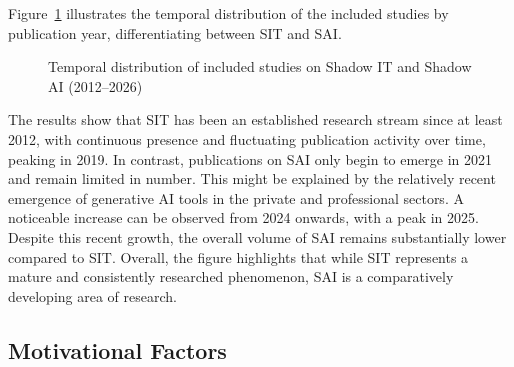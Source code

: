 \documentclass[12pt,oneside]{article}
\begin{document}
Figure~\ref{fig:shadow_it_ai_combined} illustrates the temporal distribution of the included studies by publication year, differentiating between \ac{SIT} and \ac{SAI}. 

\begin{figure}[htbp]
\centering
\small
{}

\caption{Temporal distribution of included studies on Shadow IT and Shadow AI (2012–2026)}
\label{fig:shadow_it_ai_combined}
\end{figure}

The results show that \ac{SIT} has been an established research stream since at least 2012, with continuous presence and fluctuating publication activity over time, peaking in 2019. In contrast, publications on \ac{SAI} only begin to emerge in 2021 and remain limited in number. This might be explained by the relatively recent emergence of generative \ac{AI} tools in the private and professional sectors. A noticeable increase can be observed from 2024 onwards, with a peak in 2025. Despite this recent growth, the overall volume of \ac{SAI} remains substantially lower compared to \ac{SIT}. Overall, the figure highlights that while \ac{SIT} represents a mature and consistently researched phenomenon, \ac{SAI} is a comparatively developing area of research.

\subsection{Motivational Factors} \label{motivational-factors}
\end{document}

